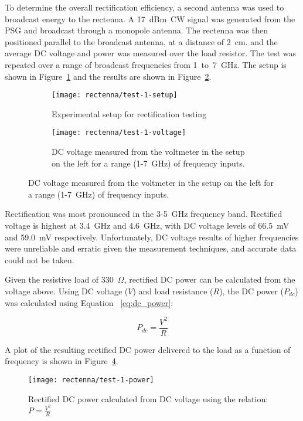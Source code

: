 To determine the overall rectification efficiency, a second antenna was used to broadcast energy to the rectenna. A 17~dBm~CW signal was generated from the PSG and broadcast through a monopole antenna. The rectenna was then positioned parallel to the broadcast antenna, at a distance of 2~cm. and the average DC voltage and power was measured over the load resistor. The test was repeated over a range of broadcast frequencies from 1~to~7~GHz. The setup is shown in Figure~\ref{fig:rectenna-test-1-setup} and the results are shown in Figure~\ref{fig:rectenna-test-1-voltage}.


\begin{figure}[h!]
    \centering
    \begin{subfigure}{.85\textwidth}
        \centering
        \texttt{[image: rectenna/test-1-setup]}
        \caption{Experimental setup for rectification testing}
        \label{fig:rectenna-test-1-setup}
    \end{subfigure}
    \begin{subfigure}{.85\textwidth}
        \centering
        \texttt{[image: rectenna/test-1-voltage]}
        \caption{DC voltage measured from the voltmeter in the setup on the left for a range (1-7~GHz) of frequency inputs.}
        \label{fig:rectenna-test-1-voltage}
    \end{subfigure}
    \label{fig:rectenna-test-1}
\end{figure}

Rectification was most pronounced in the 3-5~GHz frequency band. Rectified voltage is highest at 3.4~GHz and 4.6~GHz, with DC voltage levels of 66.5~mV and 59.0~mV respectively. Unfortunately, DC voltage results of higher frequencies were unreliable and erratic given the measurement techniques, and accurate data could not be taken.

Given the resistive load of 330~$\Omega$, rectified DC power can be calculated from the voltage above. Using DC voltage ($V$) and load resistance ($R$), the DC power ($P_{dc}$) was calculated using Equation ~\ref{eq:dc_power}:

\begin{equation}
P_{dc} = \frac{V^2}{R}
\label{eq:dc_power}
\end{equation}

A plot of the resulting rectified DC power delivered to the load as a function of frequency is shown in Figure~\ref{fig:rectenna-test-1-power}.

\begin{figure}[h!]
\centering
\texttt{[image: rectenna/test-1-power]}
    \caption[Rectified DC power]{Rectified DC power calculated from DC voltage using the relation: $P = \frac{V^2}{R}$}
    \label{fig:rectenna-test-1-power}
\end{figure}


